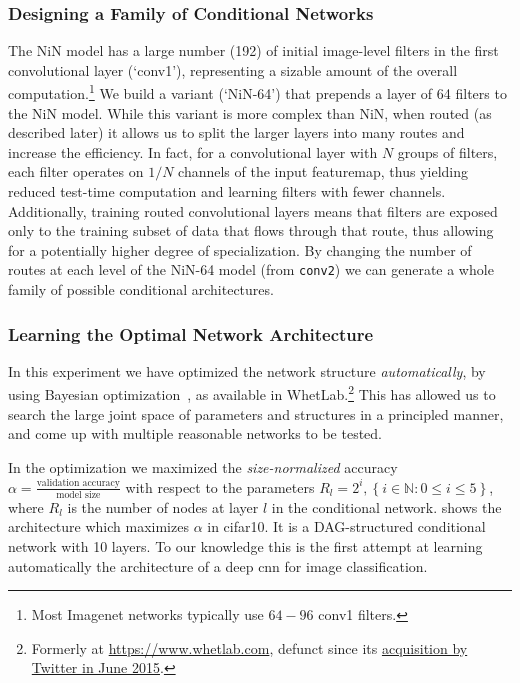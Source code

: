 \documentclass[thesis]{subfiles}
\begin{document}
	\subsubsection{Designing a Family of Conditional Networks}
	The NiN model has a large number (192) of initial image-level filters in the first convolutional layer (`conv1'), 
	representing a sizable amount of the overall computation.\footnote{Most Imagenet networks typically use $64-96$ conv1 filters.}
	We build a variant (`NiN-64') that prepends a layer of 64 filters to the NiN model.
	While this variant is more complex than NiN, when routed (as described later) it allows us 
	to split the larger layers into many routes and increase the efficiency.
	In fact, for a convolutional layer with $N$ groups of filters, each filter operates on $1/N$ channels of the input \gls{featuremap}, thus yielding reduced test-time computation and learning filters with fewer channels. 
	Additionally, training routed convolutional layers means that filters are exposed only to the training subset of data that flows through that route, thus allowing for a potentially higher degree of specialization.
	By changing the number of routes at each level of the NiN-64 model (from \texttt{conv2}) we can 
	generate a whole family of possible conditional architectures. 
	
	\subsubsection{Learning the Optimal Network Architecture}
	In this experiment we have optimized the network structure {\em automatically}, 
	by using Bayesian optimization~\citep{Snoek2012}, as available in WhetLab.\footnote{Formerly at \href{https://www.whetlab.com}{https://www.whetlab.com}, defunct since its \href{https://techcrunch.com/2015/06/17/twitter-acquires-machine-learning-startup-whetlab/}{acquisition by Twitter in June 2015}.} 
	This has allowed us to search the large joint space of parameters and structures in a principled manner, 
	and come up with multiple reasonable networks to be tested. 
	
	In the optimization we maximized the {\em size-normalized} accuracy $\alpha =\frac{\textrm{validation accuracy}}{\textrm{model size}}$ with respect to the parameters $R_l = 2^i, \left\{i\in \mathbb{N} : 0 \le i \le 5\right\}$, where $R_l$ is the number of nodes at layer $l$ in the conditional network. 
	 shows the architecture which maximizes $\alpha$ in \gls{cifar10}. 
	It is a DAG-structured conditional network with 10 layers.
	To our knowledge this is the first attempt at learning automatically the architecture of a deep \gls{cnn} for image classification.
	
\end{document}
